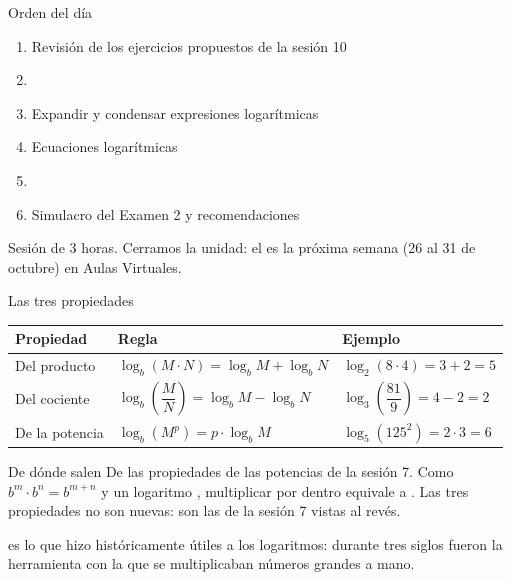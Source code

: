 \documentclass[aspectratio=169,10pt]{beamer}
\begin{document}
\portada

\begin{frame}{Orden del día}
  \begin{enumerate}
    \item Revisión de los ejercicios propuestos de la sesión 10
    \item {}
    \item Expandir y condensar expresiones logarítmicas
    \item Ecuaciones logarítmicas
    \item {}
    \item Simulacro del Examen 2 y recomendaciones
  \end{enumerate}

  \vspace{0.25cm}
  {\footnotesize\color{uniGris} Sesión de 3 horas. Cerramos la unidad: el
   es la próxima semana (26 al 31 de octubre) en
  Aulas Virtuales.}
\end{frame}


\begin{frame}{Las tres propiedades}
  \scriptsize
  \begin{center}
  \begin{tabular}{@{}p{2.6cm}p{4.4cm}p{4.8cm}@{}}
    \toprule
    \textbf{Propiedad} & \textbf{Regla} & \textbf{Ejemplo} \\
    \midrule
    Del producto &
      $\log_{b}(M\!\cdot\! N) = \log_{b}M + \log_{b}N$ &
      $\log_{2}(8\cdot 4) = 3+2 = 5$ \\
    \addlinespace
    Del cociente &
      $\log_{b}\!\left(\dfrac{M}{N}\right)
       = \log_{b}M - \log_{b}N$ &
      $\log_{3}\!\left(\dfrac{81}{9}\right) = 4-2 = 2$ \\
    \addlinespace
    De la potencia &
      $\log_{b}(M^{p}) = p\cdot\log_{b}M$ &
      $\log_{5}(125^{2}) = 2\cdot 3 = 6$ \\
    \bottomrule
  \end{tabular}
  \end{center}

  \vspace{0.1cm}
  \begin{block}{De dónde salen}
    \tiny
    De las propiedades de las potencias de la sesión 7. Como
    $b^{m}\cdot b^{n} = b^{m+n}$ y un logaritmo ,
    multiplicar por dentro equivale a . Las tres
    propiedades no son nuevas: son las de la sesión 7 vistas al revés.
  \end{block}

  \vspace{0.06cm}
  {\tiny\color{uniGris}  es lo que
  hizo históricamente útiles a los logaritmos: durante tres siglos fueron la
  herramienta con la que se multiplicaban números grandes a mano.}
\end{frame}
\end{document}

